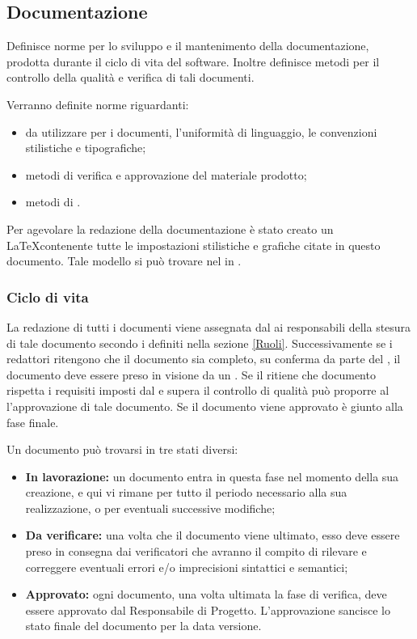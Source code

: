 \documentclass[12pt,a4paper]{article}
\begin{document}
\subsection{Documentazione}
Definisce norme per lo sviluppo e il mantenimento della documentazione, prodotta durante il ciclo di vita del software. Inoltre definisce metodi per il controllo della qualità e verifica di tali documenti.

Verranno definite norme riguardanti:
\begin{itemize}
	\item {} da utilizzare per i documenti, l'uniformità di linguaggio, le convenzioni stilistiche e tipografiche;
	\item metodi di verifica e approvazione del materiale prodotto;
	\item metodi di \textit{}.
\end{itemize}

Per agevolare la redazione della documentazione è stato creato un \textit{} \LaTeX contenente tutte le impostazioni stilistiche e grafiche citate in questo documento. Tale modello si può trovare nel  in .

\subsubsection{Ciclo di vita}

La redazione di tutti i documenti viene assegnata dal \PM{} ai responsabili della stesura di tale documento secondo i  definiti nella sezione \ref{Ruoli}. Successivamente se i redattori ritengono che il documento sia completo, su conferma da parte del \PM, il documento deve essere preso in visione da un \VR. Se il \VR{} ritiene che documento rispetta i requisiti imposti dal \PR{} e supera il controllo di qualità può proporre al \PM{} l'approvazione di tale documento. Se il documento viene approvato è giunto alla fase finale.

Un documento può trovarsi in tre stati diversi:
\begin{itemize}
	\item \textbf{In lavorazione:} un documento entra in questa fase nel momento della sua creazione, e qui vi rimane per tutto il periodo necessario alla sua realizzazione, o per eventuali successive modifiche;
	\item \textbf{Da verificare:} una volta che il documento viene ultimato, esso deve essere preso in consegna dai verificatori che avranno il compito di rilevare e correggere eventuali errori e/o imprecisioni sintattici e semantici;
	\item \textbf{Approvato:} ogni documento, una volta ultimata la fase di verifica, deve essere approvato dal Responsabile di Progetto. L’approvazione sancisce lo stato finale del documento per la data versione.
\end{itemize}
\end{document}
